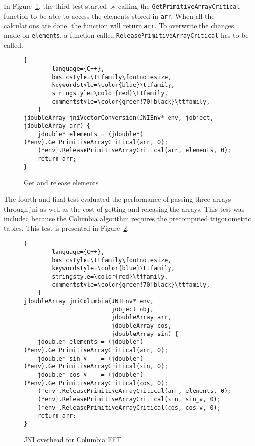 In Figure~\ref{fig:jni:conversion}, the third test started by calling the \texttt{GetPrimitiveArrayCritical} function to be able to access the elements stored in \texttt{arr}. When all the calculations are done, the function will return \texttt{arr}. To overwrite the changes made on \texttt{elements}, a function called \texttt{ReleasePrimitiveArrayCritical} has to be called.

\begin{figure}
\begin{lstlisting}[
        language={C++},
        basicstyle=\ttfamily\footnotesize,
        keywordstyle=\color{blue}\ttfamily,
        stringstyle=\color{red}\ttfamily,
        commentstyle=\color{green!70!black}\ttfamily,
    ]
jdoubleArray jniVectorConversion(JNIEnv* env, jobject, jdoubleArray arr) {
    jdouble* elements = (jdouble*)(*env).GetPrimitiveArrayCritical(arr, 0);
    (*env).ReleasePrimitiveArrayCritical(arr, elements, 0);
    return arr;
}
\end{lstlisting}
\caption{Get and release elements}
\label{fig:jni:conversion}
\end{figure}

The fourth and final test evaluated the performance of passing three arrays through \gls{jni} as well as the cost of getting and releasing the arrays. This test was included because the Columbia algorithm requires the precomputed trigonometric tables. This test is presented in Figure~\ref{fig:jni:columbia}.

\begin{figure}
\begin{lstlisting}[
        language={C++},
        basicstyle=\ttfamily\footnotesize,
        keywordstyle=\color{blue}\ttfamily,
        stringstyle=\color{red}\ttfamily,
        commentstyle=\color{green!70!black}\ttfamily,
    ]
jdoubleArray jniColumbia(JNIEnv* env,
                         jobject obj,
                         jdoubleArray arr,
                         jdoubleArray cos,
                         jdoubleArray sin) {
    jdouble* elements = (jdouble*)(*env).GetPrimitiveArrayCritical(arr, 0);
    jdouble* sin_v    = (jdouble*)(*env).GetPrimitiveArrayCritical(sin, 0);
    jdouble* cos_v    = (jdouble*)(*env).GetPrimitiveArrayCritical(cos, 0);
    (*env).ReleasePrimitiveArrayCritical(arr, elements, 0);
    (*env).ReleasePrimitiveArrayCritical(sin, sin_v, 0);
    (*env).ReleasePrimitiveArrayCritical(cos, cos_v, 0);
    return arr;
}
\end{lstlisting}
\caption{JNI overhead for Columbia FFT}
\label{fig:jni:columbia}
\end{figure}

